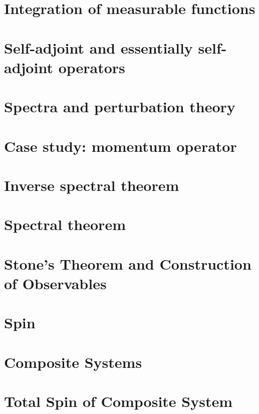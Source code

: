 \documentclass[a4paper,11pt]{article}
\theoremstyle{definition} %
\theoremstyle{plain} %
\theoremstyle{remark} %
\theoremstyle{underline}
\begin{document}
\section{Integration of measurable functions}

\newpage

\section{Self-adjoint and essentially self-adjoint operators}

\newpage

\section{Spectra and perturbation theory}

\newpage

\section{Case study: momentum operator}

\newpage

\section{Inverse spectral theorem}

\newpage

\section{Spectral theorem}

\newpage

\section{Stone's Theorem and Construction of Observables}

\newpage

\section{Spin}

\newpage

\section{Composite Systems}

\newpage

\section{Total Spin of Composite System}

\newpage
\end{document}
